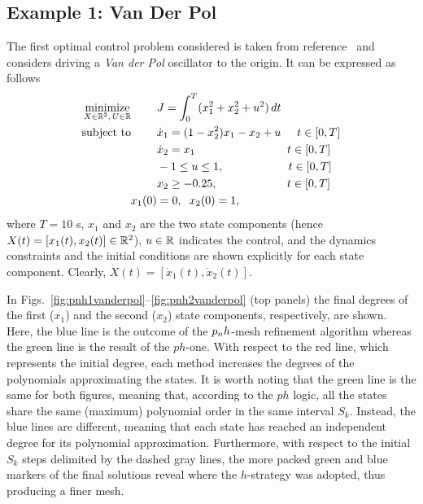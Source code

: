 \subsection*{Example 1: Van Der Pol}
The first optimal control problem considered is taken from reference~\cite{casadi:DOC:2018} and considers
driving a \emph{Van der Pol} oscillator to the origin. It can be expressed as follows
\begin{subequations}\label{eq:vanderpol}
	\begin{align}
	\underset{X \in \mathbb{R}^{2}, \, U \in \mathbb{R}}{\text{minimize}}\hspace{8mm}
	&J = \int_{0}^{T}(x_1^{2} + x_2^{2} + u^{2})\,dt  \label{eq:vancost}\\
	\text{subject to} \hspace{8mm} 
	&\dot{x}_1 = (1 - x_2^{2})x_{1} - x_2 + u \hspace{5mm} t \in[0,T] \label{eq:vandyn1}\\
	& \dot{x}_2 = x_1 \hspace{28.5mm} t \in[0,T] \label{eq:vandyn2}\\
	& -1  \leq u \leq 1,  \hspace{20mm} t \in[0,T] \label{eq:vanpath1}\\
	& x_2 \geq -0.25,  \hspace{21.5mm} t \in[0,T] \label{eq:vanpath2}\\
	 x_1(0) &= 0, \hspace{2mm} x_2(0) = 1, \label{eq:initial1}		
	\end{align}
\end{subequations}
where $T = 10$ s, $x_1$ and $x_2$ are the two state components (hence $X(t) = [x_1(t), x_2(t)]\in \mathbb{R}^2$), $u\in\mathbb{R}$ indicates the control, and the dynamics constraints and the initial conditions are shown explicitly for each state component. Clearly, $\dot{X}(t) = [\dot{x}_1(t), \dot{x}_2(t)]$.

In Figs.~\ref{fig:pnh1vanderpol}--\ref{fig:pnh2vanderpol} (top panels) the final degrees of the first ($x_1$) and the second ($x_2$) state components, respectively, are shown. Here, the blue line is the outcome of the $p_{n}h$-mesh refinement algorithm whereas the green line is the result of the $ph$-one. With respect to the red line, which represents the initial degree, each method increases the degrees of the polynomials approximating the states. It is worth noting that the green line is the same for both figures, meaning that, according to the $ph$ logic, all the states share the same (maximum) polynomial order in the same interval $S_k$. Instead, the blue lines are different, meaning that each state has reached an independent degree for its polynomial approximation.
Furthermore, with respect to the initial $S_k$ steps delimited by the dashed gray lines, the more packed green and blue markers of the final solutions reveal where the $h$-strategy was adopted, thus producing a finer mesh.


